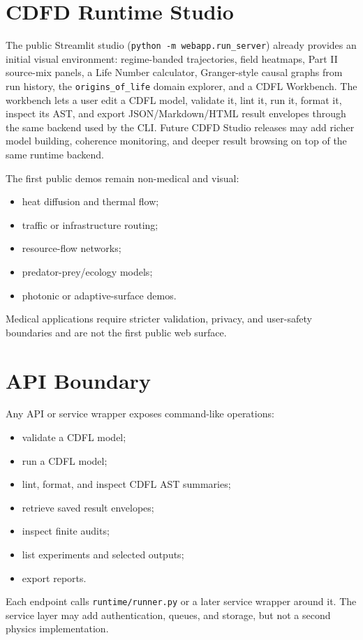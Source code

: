 \documentclass[12pt,a4paper]{article}
\begin{document}
\section{CDFD Runtime Studio}
The public Streamlit studio (\texttt{python -m webapp.run\_server}) already
provides an initial visual environment: regime-banded trajectories, field
heatmaps, Part II source-mix panels, a Life Number calculator, Granger-style
causal graphs from run history, the \texttt{origins\_of\_life} domain explorer,
and a CDFL Workbench. The workbench lets a user edit a CDFL model, validate it,
lint it, run it, format it, inspect its AST, and export JSON/Markdown/HTML
result envelopes through the same backend used by the CLI. Future CDFD Studio
releases may add richer model building, coherence monitoring, and deeper result
browsing on top of the same runtime backend.

The first public demos remain non-medical and visual:
\begin{itemize}
    \item heat diffusion and thermal flow;
    \item traffic or infrastructure routing;
    \item resource-flow networks;
    \item predator-prey/ecology models;
    \item photonic or adaptive-surface demos.
\end{itemize}
Medical applications require stricter validation, privacy, and user-safety
boundaries and are not the first public web surface.

\section{API Boundary}
Any API or service wrapper exposes command-like operations:
\begin{itemize}
    \item validate a CDFL model;
    \item run a CDFL model;
    \item lint, format, and inspect CDFL AST summaries;
    \item retrieve saved result envelopes;
    \item inspect finite audits;
    \item list experiments and selected outputs;
    \item export reports.
\end{itemize}
Each endpoint calls \texttt{runtime/runner.py} or a later service wrapper around
it. The service layer may add authentication, queues, and storage, but not a
second physics implementation.
\end{document}
